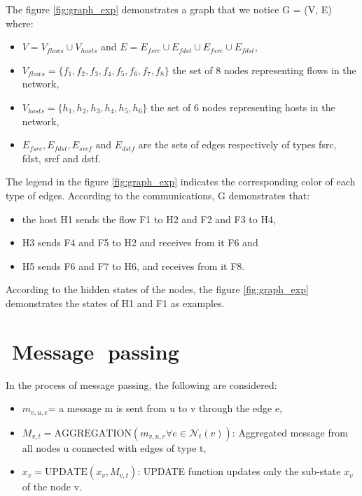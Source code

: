The figure \ref{fig:graph_exp} demonstrates a graph that we notice G = (V, E) where: 
\begin{itemize}
    \item $V = V_{flows}  \cup  V_{hosts}$ and  $E = { E_{fsrc}  \cup  E_{fdst}  \cup  E_{fsrc}  \cup  E_{fdst} }$,
    \item $V_{flows} = \{ f_1, f_2, f_3, f_4, f_5, f_6, f_7, f_8 \}$ the set of 8 nodes representing flows in the network,
    \item $V_{hosts} = \{ h_1, h_2, h_3, h_4, h_5, h_6 \}$ the set of 6 nodes representing hosts in the network,
    \item $E_{fsrc}, E_{fdst}, E_{srcf} \text{ and } E_{dstf} $ are the sets of edges respectively of types fsrc, fdst, srcf and dstf.
\end{itemize}
The legend in the figure \ref{fig:graph_exp} indicates the corresponding color of each type of edges. 
According to the communications, G demonstrates that:
\begin{itemize}
    \item the host H1 sends the flow F1 to H2 and F2 and F3 to H4,
    \item H3 sends F4 and F5 to H2 and receives from it F6 and
    \item H5 sends F6 and F7 to H6, and receives from it F8.
\end{itemize}
According to the hidden states of the nodes, the figure \ref{fig:graph_exp} demonstrates the states of H1 and F1 as examples. 
\section{\textcolor{white}{.}Message \textcolor{white}{.}passing}
In the process of message passing, the following are considered:
\begin{itemize}
    \item  $m_{v, u, e} $= a message m is sent  from u to v through the edge e,
    \item $M_{v,t} = \text{AGGREGATION}({m_{v, u, e} \forall e \in  \mathcal{N}_t (v)})$: Aggregated message from all nodes u connected with edges of type t,
    \item  $x_v = \text{UPDATE}(x_v , M_{v,t})$: UPDATE function updates only the sub-state $x_v$ of the node v.

\end{itemize}

